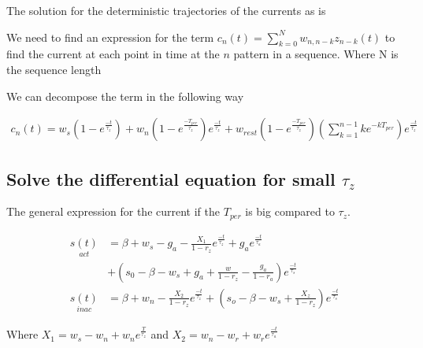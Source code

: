 \documentclass[10pt,a4paper]{article}
\begin{document}
The solution for the deterministic trajectories of the currents as is 	

We need to find an expression for the term $c_n(t) =\sum\limits_{k=0}^{N} w_{n, n - k} z_{n - k}(t)$ to find the current at each point in time at the $n$ pattern in a sequence. Where N is the sequence length

We can decompose the term in the following way

\begin{align*}
c_n(t) = w_s (1 - e^{\frac{-t}{\tau_z}}) + w_n (1 - e^{\frac{-T_{per}}{\tau_z}})e^{\frac{-t}{\tau_z}} + w_{rest}(1 - e^{
\frac{-T_{per}}{\tau_z}}) \left(\sum\limits_{k=1}^{n -1} k  e^{-kT_{per}} \right) e^{\frac{-t}{\tau_z}} 
\end{align*}


\subsection*{Solve the differential equation for small $\tau_z$}
The general expression for the current if the $T_{per}$ is big compared to $\tau_z$. 

\begin{align}
\underset{act}{s(t)} &= \beta + w_s - g_a - \frac{X_1}{1 - r_z}e^{\frac{-t}{\tau_z}} + g_a e^{\frac{-t}{\tau_a}} \\
&+ \left(s_0 - \beta - w_s + g_a + \frac{w}{1 - r_z} - \frac{g_a}{1 - r_a}\right)e^{\frac{-t}{\tau_s}} \nonumber \\
\underset{inac}{s(t)} &= \beta + w_n - \frac{X_2}{1 - r_z} e^{\frac{-t}{\tau_z}} + \left(s_o - \beta - w_s +  \frac{X_z}{1 - r_z}  \right) e^{\frac{-t}{\tau_s}}
\end{align}

Where $X_1 = w_s - w_n + w_n e^{\frac{T}{\tau_z}}$ and $X_2 = w_n - w_r + w_r e^{\frac{-t}{\tau_a}}$



\end{document}
